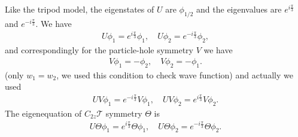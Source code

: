 \documentclass[10pt, oneside]{article}
\begin{document}
Like the tripod model, the eigenstates of \(U\) are \(\phi_{1/2}\) and the eigenvalues are \(e^{i \frac{\pi}{3}}\) and \(e^{- i \frac{\pi}{3}}\). We have 
\begin{align}
		U \phi_1 = e^{i \frac{\pi}{3}} \phi_1, \quad
		U \phi_2 = e^{- i \frac{\pi}{3}} \phi_2,
\end{align}
and correspondingly for the particle-hole symmetry \(V\) we have
\begin{align}
		V \phi_1  = - \phi_2, \quad V \phi_2  = - \phi_1.
\end{align}
(only \(w_1  = w_2\), we used this condition to check wave function) and actually we used
\begin{align}
		U V \phi_{1}  =  e^{- i \frac{\pi}{3}} V\phi_1, \quad UV \phi_{2}  =  e^{ i \frac{\pi}{3}} V\phi_2.
\end{align}
The eigenequation of \(C_{2z} \mathcal{T}\) symmetry \(\Theta\) is 
\begin{align}
	U \Theta \phi_{1} = e^{i \frac{\pi}{3}} \Theta \phi_{1}, \quad U \Theta \phi_{2} = e^{- i \frac{\pi}{3}} \Theta \phi_{2}.
\end{align}
\end{document}
